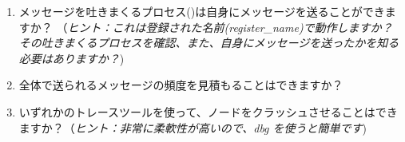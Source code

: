 \begin{enumerate}
	\item メッセージを吐きまくるプロセス()は自身にメッセージを送ることができますか？ （\emph{ヒント：これは登録された名前(register\_name)で動作しますか？ その吐きまくるプロセスを確認、また、自身にメッセージを送ったかを知る必要はありますか？})
	\item 全体で送られるメッセージの頻度を見積もることはできますか？
	\item いずれかのトレースツールを使って、ノードをクラッシュさせることはできますか？（\emph{ヒント：非常に柔軟性が高いので、dbg を使うと簡単です})
\end{enumerate}

